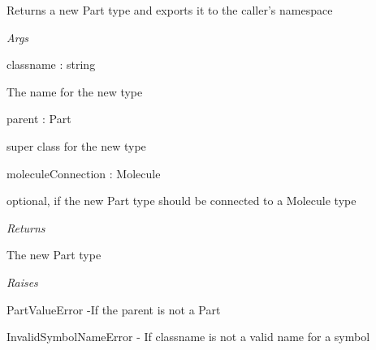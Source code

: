 \documentclass[letterpaper,10pt,english]{sphinxmanual}
\begin{document}

\begin{fulllineitems}
\label{modules/index:aosb.core.declareNewPart}
Returns a new Part type and exports it to the caller's namespace

\begin{DUlineblock}{0em}
\item[] \emph{Args}
\item[]
\begin{DUlineblock}{\DUlineblockindent}
\item[] classname : string
\item[]
\begin{DUlineblock}{\DUlineblockindent}
\item[] The name for the new type
\end{DUlineblock}
\item[] parent : Part
\item[]
\begin{DUlineblock}{\DUlineblockindent}
\item[] super class for the new type
\end{DUlineblock}
\item[] moleculeConnection : Molecule
\item[]
\begin{DUlineblock}{\DUlineblockindent}
\item[] optional, if the new Part type should be connected to a Molecule type
\end{DUlineblock}
\end{DUlineblock}
\end{DUlineblock}

\begin{DUlineblock}{0em}
\item[] \emph{Returns}
\item[]
\begin{DUlineblock}{\DUlineblockindent}
\item[] The new Part type
\end{DUlineblock}
\end{DUlineblock}

\begin{DUlineblock}{0em}
\item[] \emph{Raises}
\item[]
\begin{DUlineblock}{\DUlineblockindent}
\item[] PartValueError -If the parent is not a Part
\item[] InvalidSymbolNameError - If classname is not a valid name for a symbol
\end{DUlineblock}
\end{DUlineblock}


\end{fulllineitems}
\end{document}
